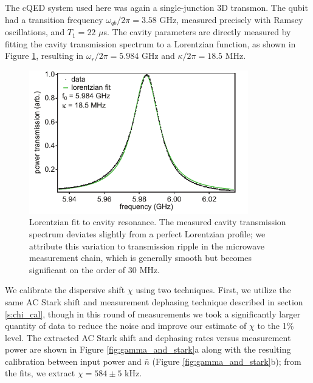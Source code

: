 The cQED system used here was again a single-junction 3D transmon.  The qubit had a transition frequency $\omega_{qb}/2 \pi = 3.58$ GHz, measured precisely with Ramsey oscillations, and $T_1 = 22$ $\mu$s.   The cavity parameters are directly measured by fitting the cavity transmission spectrum to a Lorentzian function, as shown in Figure \ref{fig:kappa}, resulting in $\omega_r / 2 \pi = 5.984$ GHz and $\kappa / 2 \pi = 18.5$ MHz.

\begin{figure}
\begin{center}
\includegraphics[width=3.75in]{twpa_exp/kappa}
\end{center}
\caption[Lorentzian fit of cavity resonance]{Lorentzian fit to cavity resonance.  The measured cavity transmission spectrum deviates slightly from a perfect Lorentzian profile; we attribute this variation to transmission ripple in the microwave measurement chain, which is generally smooth but becomes significant on the order of 30 MHz.}
\label{fig:kappa}
\end{figure}

We calibrate the dispersive shift $\chi$ using two techniques.  First, we utilize the same AC Stark shift and measurement dephasing technique described in section \ref{s:chi_cal}, though in this round of measurements we took a significantly larger quantity of data to reduce the noise and improve our estimate of $\chi$ to the 1\% level.  The extracted AC Stark shift and dephasing rates versus measurement power are shown in Figure \ref{fig:gamma_and_stark}a along with the resulting calibration between input power and $\bar{n}$ (Figure \ref{fig:gamma_and_stark}b); from the fits, we extract $\chi = 584 \pm 5$ kHz.

